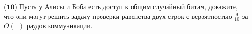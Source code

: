 ($\mathbf{10}$)
Пусть у Алисы и Боба есть доступ к общим случайный битам, докажите, что они могут решить задачу проверки равенства двух строк
с вероятностью $\frac{9}{10}$ за $O(1)$ раудов коммуникации.